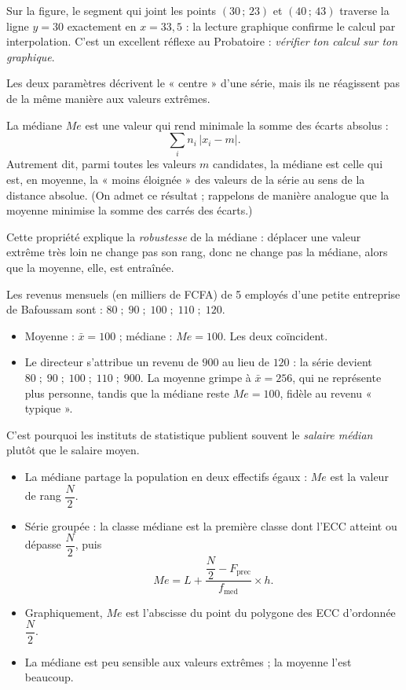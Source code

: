 \documentclass[11pt]{article}
\newcounter{popsec}
\newcounter{popsub}
\newcommand{\courssub}[1]{%
  \stepcounter{popsub}%
  \par\vspace{9pt}\noindent{\popxbold\fontsize{11.5}{13}\selectfont\color{popink}{\color{poporange}\thepopsec.\thepopsub}\hspace{6pt}#1}\par\nopagebreak\vspace{4pt}
}
\begin{document}
Sur la figure, le segment qui joint les points $(30\,;\,23)$ et $(40\,;\,43)$ traverse la ligne $y = 30$ exactement en $x = 33{,}5$ : la lecture graphique confirme le calcul par interpolation. C'est un excellent réflexe au Probatoire : \emph{vérifier ton calcul sur ton graphique}.

\courssub{Moyenne ou médiane : lequel choisir ?}

Les deux paramètres décrivent le « centre » d'une série, mais ils ne réagissent pas de la même manière aux valeurs extrêmes.

\begin{propriete}
La médiane $Me$ est une valeur qui rend minimale la somme des écarts absolus :
\[ \sum_{i} n_i \, |x_i - m|. \]
Autrement dit, parmi toutes les valeurs $m$ candidates, la médiane est celle qui est, en moyenne, la « moins éloignée » des valeurs de la série au sens de la distance absolue. (On admet ce résultat ; rappelons de manière analogue que la moyenne minimise la somme des carrés des écarts.)
\end{propriete}

Cette propriété explique la \emph{robustesse} de la médiane : déplacer une valeur extrême très loin ne change pas son rang, donc ne change pas la médiane, alors que la moyenne, elle, est entraînée.

\begin{exemplebox}
Les revenus mensuels (en milliers de FCFA) de 5 employés d'une petite entreprise de Bafoussam sont : $80 \;;\; 90 \;;\; 100 \;;\; 110 \;;\; 120$.
\begin{itemize}
\item Moyenne : $\bar{x} = 100$ ; médiane : $Me = 100$. Les deux coïncident.
\item Le directeur s'attribue un revenu de $900$ au lieu de $120$ : la série devient $80 \;;\; 90 \;;\; 100 \;;\; 110 \;;\; 900$. La moyenne grimpe à $\bar{x} = 256$, qui ne représente plus personne, tandis que la médiane reste $Me = 100$, fidèle au revenu « typique ».
\end{itemize}
C'est pourquoi les instituts de statistique publient souvent le \emph{salaire médian} plutôt que le salaire moyen.
\end{exemplebox}

\begin{aretenir}
\begin{itemize}
\item La médiane partage la population en deux effectifs égaux : $Me$ est la valeur de rang $\dfrac{N}{2}$.
\item Série groupée : la classe médiane est la première classe dont l'ECC atteint ou dépasse $\dfrac{N}{2}$, puis
\[ Me = L + \frac{\dfrac{N}{2} - F_{\text{prec}}}{f_{\text{med}}} \times h. \]
\item Graphiquement, $Me$ est l'abscisse du point du polygone des ECC d'ordonnée $\dfrac{N}{2}$.
\item La médiane est peu sensible aux valeurs extrêmes ; la moyenne l'est beaucoup.
\end{itemize}
\end{aretenir}
\end{document}
